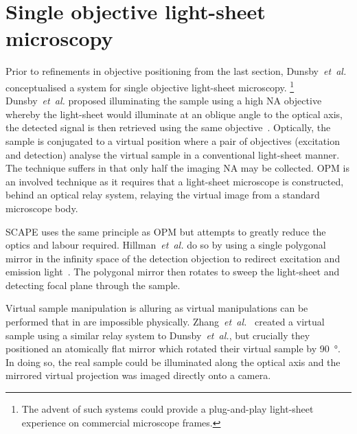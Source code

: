 \section{Single objective \gls{light-sheet} microscopy}


Prior to refinements in objective positioning from the last section, Dunsby~\emph{et~al.} conceptualised a system for single objective \gls{light-sheet} microscopy.
\footnote{The advent of such systems could provide a plug-and-play \gls{light-sheet} experience on commercial microscope frames.}
Dunsby~\emph{et~al.} proposed illuminating the sample using a high \gls{NA} objective whereby the \gls{light-sheet} would illuminate at an oblique angle to the optical axis, the detected signal is then retrieved using the same objective~\cite{dunsby_optically_2008}.
Optically, the sample is conjugated to a virtual position where a pair of objectives (excitation and detection) analyse the virtual sample in a conventional \gls{light-sheet} manner.
The technique suffers in that only half the imaging \gls{NA} may be collected.
\gls{OPM} is an involved technique as it requires that a \gls{light-sheet} microscope is constructed, behind an optical relay system, relaying the virtual image from a standard microscope body.

\gls{SCAPE} uses the same principle as \gls{OPM} but attempts to greatly reduce the optics and labour required.
Hillman~\emph{et~al.} do so by using a single polygonal mirror in the infinity space of the detection objection to redirect excitation and emission light~\cite{bouchardSweptConfocallyalignedPlanar2015a}.
The polygonal mirror then rotates to sweep the light-sheet and detecting focal plane through the sample.

Virtual sample manipulation is alluring as virtual manipulations can be performed that in are impossible physically.
Zhang~\emph{et~al.}~\cite{li_axial_2014} created a virtual sample using a similar relay system to Dunsby~\emph{et~al.}, but crucially they positioned an atomically flat mirror which rotated their virtual sample by \SI{90}{\degree}.
In doing so, the real sample could be illuminated along the optical axis and the mirrored virtual projection was imaged directly onto a camera. %

